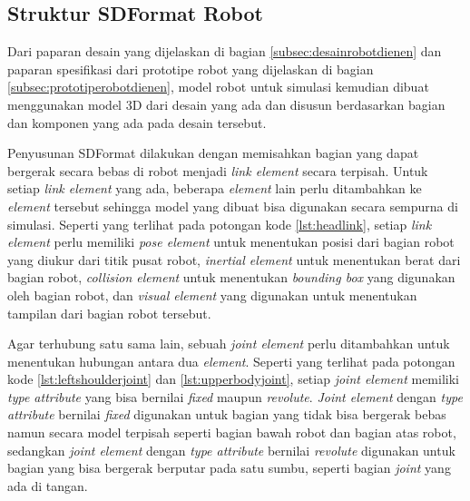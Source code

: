 \subsection{Struktur SDFormat Robot}
\label{subsec:sdformatrobot}

Dari paparan desain yang dijelaskan di bagian \ref{subsec:desainrobotdienen} dan paparan spesifikasi dari prototipe robot yang dijelaskan di bagian \ref{subsec:prototiperobotdienen},
  model robot untuk simulasi kemudian dibuat menggunakan model 3D dari desain yang ada dan disusun berdasarkan bagian dan komponen yang ada pada desain tersebut.

Penyusunan SDFormat dilakukan dengan memisahkan bagian yang dapat bergerak secara bebas di robot menjadi \emph{link element} secara terpisah.
Untuk setiap \emph{link element} yang ada,
  beberapa \emph{element} lain perlu ditambahkan ke \emph{element} tersebut sehingga model yang dibuat bisa digunakan secara sempurna di simulasi.
Seperti yang terlihat pada potongan kode \ref{lst:headlink},
  setiap \emph{link element} perlu memiliki \emph{pose element} untuk menentukan posisi dari bagian robot yang diukur dari titik pusat robot,
  \emph{inertial element} untuk menentukan berat dari bagian robot,
  \emph{collision element} untuk menentukan \emph{bounding box} yang digunakan oleh bagian robot,
  dan \emph{visual element} yang digunakan untuk menentukan tampilan dari bagian robot tersebut.



Agar terhubung satu sama lain,
  sebuah \emph{joint element} perlu ditambahkan untuk menentukan hubungan antara dua \emph{element}.
Seperti yang terlihat pada potongan kode \ref{lst:leftshoulderjoint} dan \ref{lst:upperbodyjoint},
  setiap \emph{joint element} memiliki \emph{type attribute} yang bisa bernilai \emph{fixed} maupun \emph{revolute}.
\emph{Joint element} dengan \emph{type attribute} bernilai \emph{fixed} digunakan untuk bagian yang tidak bisa bergerak bebas namun secara model terpisah seperti bagian bawah robot dan bagian atas robot,
  sedangkan \emph{joint element} dengan \emph{type attribute} bernilai \emph{revolute} digunakan untuk bagian yang bisa bergerak berputar pada satu sumbu, seperti bagian \emph{joint} yang ada di tangan.



